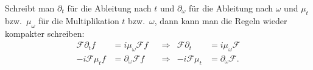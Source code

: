 Schreibt man $\partial_t$ für die Ableitung nach $t$ und $\partial_\omega$
für die Ableitung nach $\omega$ und $\mu_{t}$ bzw.~$\mu_{\omega}$ für
die Multiplikation $t$ bzw.~$\omega$, dann kann man die Regeln wieder
kompakter schreiben:
\[
\begin{aligned}
\mathcal{F}\partial_t f &= i\mu_{\omega}\mathcal{F}f
&&\Rightarrow&
\mathcal{F}\partial_t &= i\mu_{\omega}\mathcal{F}
\\
-i\mathcal{F}\mu_t f &= \partial_\omega\mathcal{F} f
&&\Rightarrow&
-i\mathcal{F}\mu_t &= \partial_\omega\mathcal{F}.
\end{aligned}
\]







